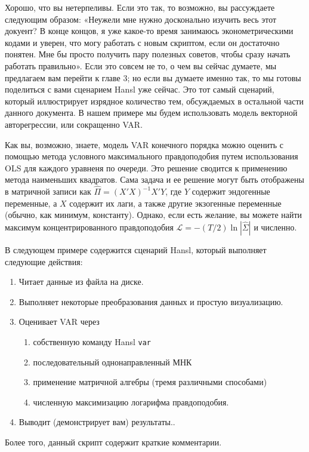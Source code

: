 \documentclass[oneside]{book}
\begin{document}
Хорошо, что вы нетерпеливы. Если это так, то возможно, вы рассуждаете
следующим образом: «Неужели мне нужно досконально изучить весь этот
докуент? В конце концов, я уже какое-то время занимаюсь
эконометрическими кодами и уверен, что могу работать с новым скриптом,
если он достаточно понятен. Мне бы просто получить пару полезных
советов, чтобы сразу начать работать правильно». Если это совсем не
то, о чем вы сейчас думаете, мы предлагаем вам перейти к главе 3; но
если вы думаете именно так, то мы готовы поделиться с вами сценарием
Hansl уже сейчас. Это тот самый сценарий, который иллюстрирует
изрядное количество тем, обсуждаемых в остальной части данного
документа. В нашем примере мы будем использовать модель векторной
авторегрессии, или сокращенно VAR.

Как вы, возможно, знаете, модель VAR конечного порядка можно оценить с
помощью метода условного максимального правдоподобия путем
использования OLS для каждого уравненя по очереди. Это решение
сводится к применению метода наименьших квадратов. Сама задача и ее
решение могут быть отображены в матричной записи как
$\hat{\Pi} = (X'X)^{-1} X'Y$, где $Y$ содержит эндогенные переменные,
а $X$ содержит их лаги, а также другие экзогенные переменные (обычно,
как минимум, константу). Однако, если есть желание, вы можете найти
максимум концентрированного правдоподобия
$\mathcal{L} = -(T/2) \ln|\hat{\Sigma}|$ и численно.

В следующем примере содержится сценарий Hansl, который выполняет
следующие действия:
\begin{enumerate}
\item Читает данные из файла на диске.
\item Выполняет некоторые преобразования данных и простую визуализацию.
\item Оценивает VAR через
  \begin{enumerate}
  \item собственную команду Hansl \texttt{var} 
  \item последовательный однонаправленный МНК
  \item применение матричной алгебры (тремя различными способами)
  \item численную максимизацию логарифма правдоподобия.
  \end{enumerate}
\item Выводит (демонстрирует вам) результаты..
\end{enumerate}
Более того, данный скрипт содержит краткие комментарии.
\end{document}
